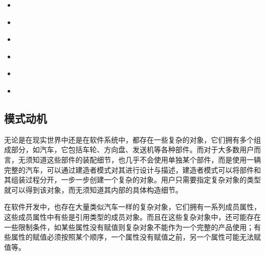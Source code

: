 \documentclass[letterpaper,10pt,english]{sphinxmanual}
\begin{document}
\begin{sphinxShadowBox}
\begin{itemize}
\begin{itemize}
\item {} 
\sphinxAtStartPar
{}\label{\detokenize{creational_patterns/builder:id24}}{\hyperref[\detokenize{creational_patterns/builder:id10}]{}}

\item {} 
\sphinxAtStartPar
{}\label{\detokenize{creational_patterns/builder:id25}}{\hyperref[\detokenize{creational_patterns/builder:id11}]{}}

\item {} 
\sphinxAtStartPar
{}\label{\detokenize{creational_patterns/builder:id26}}{\hyperref[\detokenize{creational_patterns/builder:id12}]{}}

\item {} 
\sphinxAtStartPar
{}\label{\detokenize{creational_patterns/builder:id27}}{\hyperref[\detokenize{creational_patterns/builder:id13}]{}}

\item {} 
\sphinxAtStartPar
{}\label{\detokenize{creational_patterns/builder:id28}}{\hyperref[\detokenize{creational_patterns/builder:id14}]{}}

\item {} 
\sphinxAtStartPar
{}\label{\detokenize{creational_patterns/builder:id29}}{\hyperref[\detokenize{creational_patterns/builder:id15}]{}}

\end{itemize}

\end{itemize}
\end{sphinxShadowBox}


\subsection{模式动机}
\label{\detokenize{creational_patterns/builder:id3}}
\sphinxAtStartPar
无论是在现实世界中还是在软件系统中，都存在一些复杂的对象，它们拥有多个组成部分，如汽车，它包括车轮、方向盘、发送机等各种部件。而对于大多数用户而言，无须知道这些部件的装配细节，也几乎不会使用单独某个部件，而是使用一辆完整的汽车，可以通过建造者模式对其进行设计与描述，建造者模式可以将部件和其组装过程分开，一步一步创建一个复杂的对象。用户只需要指定复杂对象的类型就可以得到该对象，而无须知道其内部的具体构造细节。

\sphinxAtStartPar
在软件开发中，也存在大量类似汽车一样的复杂对象，它们拥有一系列成员属性，这些成员属性中有些是引用类型的成员对象。而且在这些复杂对象中，还可能存在一些限制条件，如某些属性没有赋值则复杂对象不能作为一个完整的产品使用；有些属性的赋值必须按照某个顺序，一个属性没有赋值之前，另一个属性可能无法赋值等。
\end{document}
